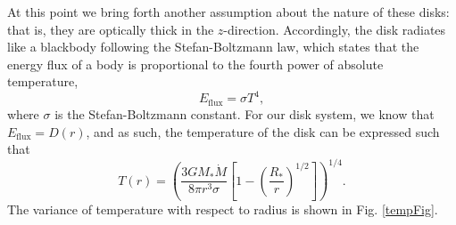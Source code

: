 \documentclass[aps,pra,twocolumn]{revtex4-1}
\begin{document}
At this point we bring forth another assumption about the nature of these disks: that is, they are optically thick in the $z$-direction.  Accordingly, the disk radiates like a blackbody following the Stefan-Boltzmann law, which states that the energy flux of a body is proportional to the fourth power of absolute temperature,
\begin{equation}
E_{\text{flux}} = \sigma T^4,
\end{equation}
where $\sigma$ is the Stefan-Boltzmann constant.  For our disk system, we know that $E_\text{flux} = D(r)$, and as such, the temperature of the disk can be expressed such that \cite{armitage2011, king2002}
\begin{equation}
T(r) = \left( \frac{3GM_*\dot{M}}{8\pi r^3 \sigma}\left[ 1 - \left( \frac{R_*}{r}\right)^{1/2}\right] \right)^{1/4}. \label{tempEq}
\end{equation}
The variance of temperature with respect to radius is shown in Fig. \ref{tempFig}.
\end{document}
